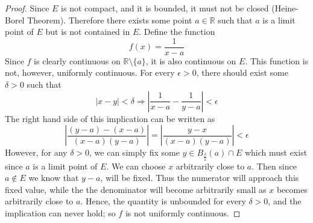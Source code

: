 \documentclass{article}
\theoremstyle{definition}
\begin{document}
    \begin{proof}
        Since $E$ is not compact, and it is bounded, it must not be closed (Heine-Borel Theorem).
        Therefore there exists some point $a \in \mathbb{R}$ such that $a$ is a limit point of $E$ but
        is not contained in $E$. Define the function
        \[
            f(x) = \frac{1}{x-a}    
        \]
        Since $f$ is clearly continuous on $\mathbb{R} \setminus \{a\}$, it is also continuous on $E$. 
        This function is not, however, uniformly continuous.
        For every $\epsilon > 0$, there should exist some $\delta > 0$ such that 
        \[
            |x - y| < \delta \Longrightarrow \left|\frac{1}{x-a} - \frac{1}{y-a}\right| < \epsilon
        \]
        The right hand side of this implication can be written as 
        \[
            \left|\frac{(y-a) - (x - a)}{(x-a)(y-a)}\right| = \left|\frac{y-x}{(x-a)(y-a)}\right|
             < \epsilon
        \]
        However, for any $\delta > 0$, we can simply fix some $y \in B_{\frac{\delta}{2}}(a) \cap E$ which must exist 
        since $a$ is a limit point of $E$. We can choose $x$ arbitrarily close to $a$. Then since $a \notin E$ we know that $y - a$, will be fixed.
        Thus the numerator will approach this fixed value, while the the denominator will become arbitrarily small as $x$ becomes arbitrarily close to $a$.
        Hence, the quantity is unbounded for every $\delta > 0$, and the implication can never hold; so $f$ is not uniformly continuous.
    \end{proof}
\end{document}
